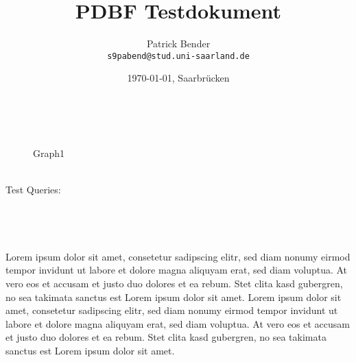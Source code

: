 \documentclass[10pt]{scrartcl}
\title{PDBF Testdokument}
\author{
 Patrick Bender\\
  \texttt{s9pabend@stud.uni-saarland.de}
}
\date{\today{}, Saarbrücken}
\begin{document}
\maketitle
\begin{wrapfigure}{r}{0.47\textwidth}
{ \centering %
%
\\ }
\vspace{-5pt}
\caption{Graph1}
\vspace{-20pt}
\end{wrapfigure} ~\\
Test Queries:\\[3pt]
\\[3pt]
\\[3pt]
\\
\\[8pt]
Lorem ipsum  dolor sit amet, consetetur sadipscing elitr, sed diam nonumy eirmod tempor invidunt ut labore et dolore magna aliquyam erat, sed diam voluptua. At vero eos et accusam et justo duo dolores et ea rebum. Stet clita kasd gubergren, no sea takimata sanctus est Lorem ipsum dolor sit amet. Lorem ipsum dolor sit amet, consetetur sadipscing elitr, sed diam nonumy eirmod tempor invidunt ut labore et dolore magna aliquyam erat, sed diam voluptua. At vero eos et accusam et justo duo dolores et ea rebum. Stet clita kasd gubergren, no sea takimata sanctus est Lorem ipsum dolor sit amet.\\
\end{document}
